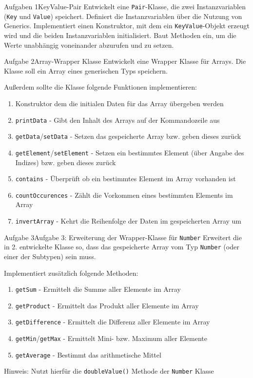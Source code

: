 \begin{frame}{Aufgaben 1}{KeyValue-Pair}
    Entwickelt eine \texttt{Pair}-Klasse, die zwei Instanzvariablen (\texttt{Key} und \texttt{Value}) speichert. Definiert die Instanzvariablen über die Nutzung von Generics.
    Implementiert einen Konstruktor, mit dem ein \texttt{KeyValue}-Objekt erzeugt wird und die beiden Instanzvariablen initialisiert. Baut Methoden ein, um die Werte unabhängig voneinander abzurufen und zu setzen.
\end{frame}

\begin{frame}[allowframebreaks]{Aufgabe 2}{Array-Wrapper Klasse}
    Entwickelt eine Wrapper Klasse für Arrays. Die Klasse soll ein Array eines generischen Typs speichern.

    Außerdem sollte die Klasse folgende Funktionen implementieren:
    \begin{enumerate}
        \item Konstruktor dem die initialen Daten für das Array übergeben werden
        \item \texttt{printData} - Gibt den Inhalt des Arrays auf der Kommandozeile aus
        \item \texttt{getData}/\texttt{setData} - Setzen das gespeicherte Array bzw. geben dieses zurück
        \item \texttt{getElement}/\texttt{setElement} - Setzen ein bestimmtes Element (über Angabe des Indizes) bzw. geben dieses zurück
        \item \texttt{contains} - Überprüft ob ein bestimmtes Element im Array vorhanden ist
        \item \texttt{countOccurences} - Zählt die Vorkommen eines bestimmten Elements im Array
        \item \texttt{invertArray} - Kehrt die Reihenfolge der Daten im gespeicherten Array um
    \end{enumerate}
\end{frame}

\begin{frame}{Aufgabe 3}{Aufgabe 3: Erweiterung der Wrapper-Klasse für \texttt{Number}}
    Erweitert die in 2. entwickelte Klasse so, dass das gespeicherte Array vom Typ \texttt{Number} (oder einer der Subtypen) sein muss.

    Implementiert zusätzlich folgende Methoden:
    \begin{enumerate}
        \item \texttt{getSum} - Ermittelt die Summe aller Elemente im Array
        \item \texttt{getProduct} - Ermittelt das Produkt aller Elemente im Array
        \item \texttt{getDifference} - Ermittelt die Differenz aller Elemente im Array
        \item \texttt{getMin}/\texttt{getMax} - Ermittelt Mini- bzw. Maximum aller Elemente
        \item \texttt{getAverage} - Bestimmt das arithmetische Mittel
    \end{enumerate}

    Hinweis: Nutzt hierfür die \texttt{doubleValue()} Methode der \texttt{Number} Klasse
\end{frame}

